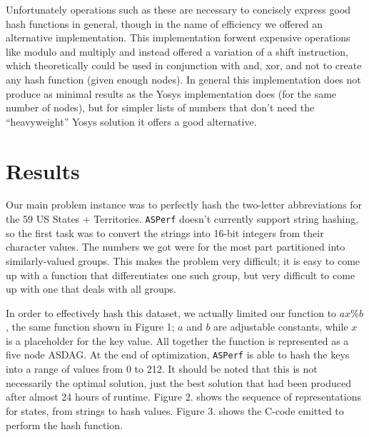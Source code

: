 \documentclass{article}
\begin{document}
Unfortunately operations such as these are necessary to concisely express good hash functions in general, though in the name of efficiency we offered an alternative implementation. This implementation forwent expensive operations like modulo and multiply and instead offered a variation of a shift instruction, which theoretically could be used in conjunction with and, xor, and not to create any hash function (given enough nodes). In general this implementation does not produce as minimal results as the Yosys implementation does (for the same number of nodes), but for simpler lists of numbers that don't need the ``heavyweight'' Yosys solution it offers a good alternative.


\section{Results}

Our main problem instance was to perfectly hash the two-letter abbreviations for the 59 US States + Territories. \texttt{ASPerf} doesn't currently support string hashing, so the first task was to convert the strings into 16-bit integers from their character values. The numbers we got were for the most part partitioned into similarly-valued groups. This makes the problem very difficult; it is easy to come up with a function that differentiates one such group, but very difficult to come up with one that deals with all groups.

In order to effectively hash this dataset, we actually limited our function to $ax \% b$, the same function shown in Figure 1; $a$ and $b$ are adjustable constants, while $x$ is a placeholder for the key value. All together the function is represented as a five node ASDAG. At the end of optimization, \texttt{ASPerf} is able to hash the keys into a range of values from 0 to 212. It should be noted that this is not necessarily the optimal solution, just the best solution that had been produced after almost 24 hours of runtime. Figure 2. shows the sequence of representations for states, from strings to hash values. Figure 3. shows the C-code emitted to perform the hash function.
\end{document}
